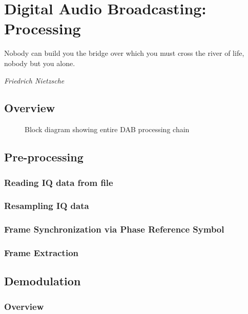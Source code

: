 \documentclass[class=report,11pt,crop=false]{standalone}
\begin{document}
\ifstandalone
\tableofcontents
\fi
\chapter{Digital Audio Broadcasting: Processing}
\epigraph{Nobody can build you the bridge over which you must cross the river of life, nobody but you alone.}%
    {\emph{Friedrich Nietzsche}}

\section{Overview}

\begin{figure}[htbp]
    \centering
    \def\svgwidth{\linewidth}
    
    \caption{Block diagram showing entire DAB processing chain}
    \label{fig:BD_Overview_All}
\end{figure}

\section{Pre-processing \label{sect:dab-proc_preprocessing}}
\subsection{Reading IQ data from file \label{sect:dab-proc_preprocessing_iq-read}}
\subsection{Resampling IQ data \label{sect:dab-proc_preprocessing_iq-resample}}
\subsection{Frame Synchronization via Phase Reference Symbol}
\subsection{Frame Extraction}

\section{Demodulation}
\subsection{Overview}
\end{document}
